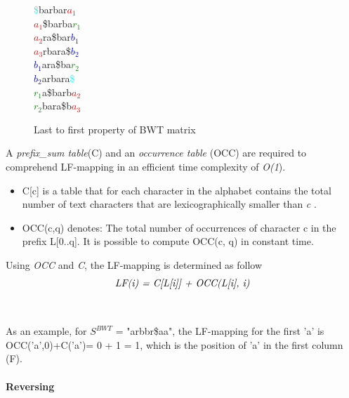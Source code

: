 \documentclass[11pt,a4paper]{report}
\begin{document}
\begin{figure}[H]
\centering
\textcolor{cyan}{\$}barbar\textcolor{red}{$a_1$}\\
\textcolor{red}{$a_1$}\$barba\textcolor{green}{$r_1$}\\
\textcolor{red}{$a_2$}ra\$bar\textcolor{blue}{$b_1$}\\
\textcolor{red}{$a_3$}rbara\$\textcolor{blue}{$b_2$}\\
\textcolor{blue}{$b_1$}ara\$ba\textcolor{green}{$r_2$}\\
\textcolor{blue}{$b_2$}arbara\textcolor{cyan}{\$}\\
\textcolor{green}{$r_1$}a\$barb\textcolor{red}{$a_2$}\\
\textcolor{green}{$r_2$}bara\$b\textcolor{red}{$a_3$}
 \caption{Last to first property of BWT matrix}
 \label{Lemma1}
\end{figure}

A \emph{prefix\_sum table}(C) and an \emph{occurrence table}
(OCC) are required to comprehend LF-mapping in an efficient time 
complexity of \emph{O(1}).\\

\begin{itemize}

	\item C[c] is a table that for each character in 
	the alphabet contains the total number of text 
	characters that are lexicographically smaller than
	 \emph{c} \cite{fmindex}.

	
	\item OCC(c,q) denotes:  The total number of 
	occurrences of character c in the prefix 
	L[0..q]\cite{fmindex}. It is possible to 
	compute OCC(c, q) in constant time.
	
\end{itemize}

Using \emph{OCC} and \emph{C}, the LF-mapping 
is determined as follow
$$\emph{LF(i) = C[L[i]] + OCC(L[i], i)}$$ \\\\

As an example, for $S^{BWT}$ = "arbbr\$aa", the LF-mapping
for the first 'a' is OCC('a',0)+C('a')= 0 + 1 = 1, which is 
the position of 'a' in the first column (F).





\paragraph{Reversing} \label{Reversing}
\end{document}
